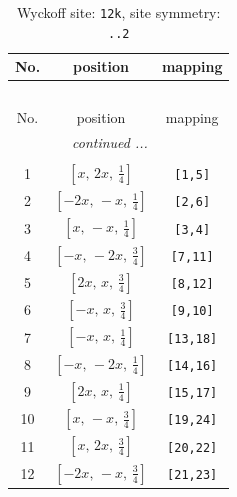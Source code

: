 \documentclass[fleqn,8pt]{jsarticle}
\begin{document}
\begin{longtable}{ccc}
\caption{Wyckoff site: {\tt 12k}, site symmetry: {\tt ..2}}
 \\
 \hline \hline
No. & position & mapping \\ \hline \endfirsthead

\multicolumn{2}{l}{\tablename\ \thetable{}} \\
 \hline \hline
No. & position & mapping \\ \hline \endhead

 \hline \hline
\multicolumn{2}{r}{\footnotesize\it continued ...} \\ \endfoot

 \hline \hline
\multicolumn{2}{r}{} \\ \endlastfoot

1 & $\left[ x,\, 2 x,\, \frac{1}{4} \right]$ & {\tt [1,5]} \\ \hline
2 & $\left[ - 2 x,\, - x,\, \frac{1}{4} \right]$ & {\tt [2,6]} \\ \hline
3 & $\left[ x,\, - x,\, \frac{1}{4} \right]$ & {\tt [3,4]} \\ \hline
4 & $\left[ - x,\, - 2 x,\, \frac{3}{4} \right]$ & {\tt [7,11]} \\ \hline
5 & $\left[ 2 x,\, x,\, \frac{3}{4} \right]$ & {\tt [8,12]} \\ \hline
6 & $\left[ - x,\, x,\, \frac{3}{4} \right]$ & {\tt [9,10]} \\ \hline
7 & $\left[ - x,\, x,\, \frac{1}{4} \right]$ & {\tt [13,18]} \\ \hline
8 & $\left[ - x,\, - 2 x,\, \frac{1}{4} \right]$ & {\tt [14,16]} \\ \hline
9 & $\left[ 2 x,\, x,\, \frac{1}{4} \right]$ & {\tt [15,17]} \\ \hline
10 & $\left[ x,\, - x,\, \frac{3}{4} \right]$ & {\tt [19,24]} \\ \hline
11 & $\left[ x,\, 2 x,\, \frac{3}{4} \right]$ & {\tt [20,22]} \\ \hline
12 & $\left[ - 2 x,\, - x,\, \frac{3}{4} \right]$ & {\tt [21,23]} \\
\end{longtable}
\renewcommand{\arraystretch}{1.2}
\end{document}
